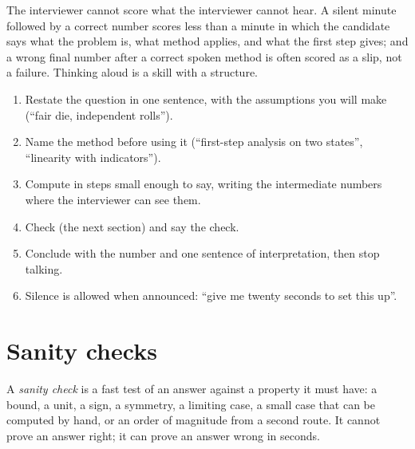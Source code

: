 The interviewer cannot score what the interviewer cannot hear. A silent minute followed by a correct number
scores less than a minute in which the candidate says what the problem is, what method applies, and what the
first step gives; and a wrong final number after a correct spoken method is often scored as a slip, not a
failure. Thinking aloud is a skill with a structure.

\begin{method}\label{met:iv:phone-and-technical-screens:aloud}
\begin{enumerate}
\item Restate the question in one sentence, with the assumptions you will make (``fair die, independent
rolls'').
\item Name the method before using it (``first-step analysis on two states'', ``linearity with
indicators'').
\item Compute in steps small enough to say, writing the intermediate numbers where the interviewer can see
them.
\item Check (the next section) and say the check.
\item Conclude with the number and one sentence of interpretation, then stop talking.
\item Silence is allowed when announced: ``give me twenty seconds to set this up''.
\end{enumerate}
\end{method}

\section{Sanity checks}

\begin{definition}\label{def:iv:phone-and-technical-screens:sanity}
A \emph{sanity check} is a fast test of an answer against a property it must have: a
bound, a unit, a sign, a symmetry, a limiting case, a small case that can be computed by hand, or an order of
magnitude from a second route. It cannot prove an answer right; it can prove an answer wrong in seconds.
\end{definition}

